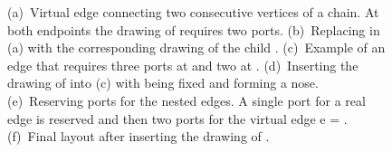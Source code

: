 \documentclass[a4paper,twoside,11pt]{article}
\begin{document}
\begin{description}
\begin{figure}[t]
    \centering
     \begin{minipage}[b]{.16\textwidth}
        \centering
    \end{minipage}
    \begin{minipage}[b]{.16\textwidth}
        \centering
    \end{minipage}
    \begin{minipage}[b]{.16\textwidth}
        \centering
    \end{minipage}
    \begin{minipage}[b]{.16\textwidth}
        \centering
    \end{minipage}
    \begin{minipage}[b]{.16\textwidth}
        \centering
    \end{minipage}
    \begin{minipage}[b]{.16\textwidth}
        \centering
    \end{minipage}
    \caption{
    (a)~Virtual edge  connecting two consecutive vertices of a chain. At both endpoints the drawing of  requires two ports.
    (b)~Replacing  in (a) with the corresponding drawing of the child .
    (c)~Example of an edge  that requires three ports at  and two at  .
    (d)~Inserting the drawing of  into (c) with  being fixed and  forming a nose.
    (e)~Reserving ports for the nested edges. A single port for a real edge is reserved and then two ports for the virtual edge e = .
    (f)~Final layout after inserting the drawing of .}
    \label{fig:5p_bicon_R}
\end{figure}


\end{description}
\end{document}
